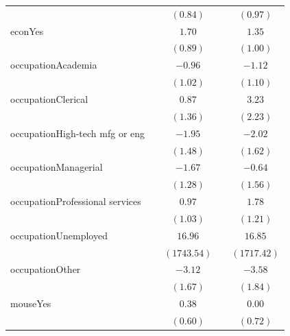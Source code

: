 \documentclass[
  12,
  letterpaper,
  DIV=11,
  numbers=noendperiod]{scrartcl}
\begin{document}
\begin{table}
{\begin{center}
\begin{tabular}{l c c c c}
                                &               & $(0.84)$      &               & $(0.97)$      \\
econYes                         &               & $1.70$        &               & $1.35$        \\
                                &               & $(0.89)$      &               & $(1.00)$      \\
occupationAcademia              &               & $-0.96$       &               & $-1.12$       \\
                                &               & $(1.02)$      &               & $(1.10)$      \\
occupationClerical              &               & $0.87$        &               & $3.23$        \\
                                &               & $(1.36)$      &               & $(2.23)$      \\
occupationHigh-tech mfg or eng  &               & $-1.95$       &               & $-2.02$       \\
                                &               & $(1.48)$      &               & $(1.62)$      \\
occupationManagerial            &               & $-1.67$       &               & $-0.64$       \\
                                &               & $(1.28)$      &               & $(1.56)$      \\
occupationProfessional services &               & $0.97$        &               & $1.78$        \\
                                &               & $(1.03)$      &               & $(1.21)$      \\
occupationUnemployed            &               & $16.96$       &               & $16.85$       \\
                                &               & $(1743.54)$   &               & $(1717.42)$   \\
occupationOther                 &               & $-3.12$       &               & $-3.58$       \\
                                &               & $(1.67)$      &               & $(1.84)$      \\
mouseYes                        &               & $0.38$        &               & $0.00$        \\
                                &               & $(0.60)$      &               & $(0.72)$      \\

\end{tabular}
\end{center}}
\end{table}
\end{document}

